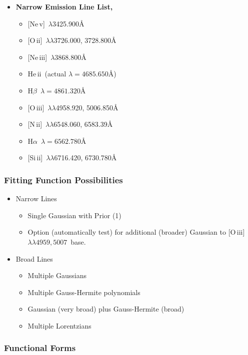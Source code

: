 \documentclass[12pt,letterpaper]{article}
\newcommand{\Halpha}{\ifmmode {\rm H}\alpha \else H$\alpha$\fi}
\newcommand{\Hbeta}{\ifmmode {\rm H}\beta \else H$\beta$\fi}
\newcommand{\heii}{He\,{\sc ii}}
\newcommand{\neiii}{Ne\,{\sc iii}}
\newcommand{\nev}{Ne\,{\sc v}}
\newcommand{\nii}{N\,{\sc ii}}
\newcommand{\oii}{O\,{\sc ii}}
\newcommand{\oiii}{O\,{\sc iii}}
\newcommand{\ob}{[O\,{\sc iii}]\,$\lambda \lambda 4959,5007$}
\newcommand{\Sizw}{Si\,{\sc ii}}
\begin{document}
\begin{itemize}
\item{\bf Narrow Emission Line List, }
  \begin{itemize}
    \itemsep-0.1cm
    \item {[\nev]\, $\lambda$3425.900\AA}
    \item {[\oii]\, $\lambda \lambda$3726.000, 3728.800\AA}
    \item {[\neiii]\, $\lambda$3868.800\AA}
    \item \heii\ (actual $\lambda=4685.650$\AA) 
    \item \Hbeta\ $\lambda=4861.320$\AA
    \item {[\oiii]\, $\lambda \lambda$4958.920, 5006.850\AA}
    \item {[\nii]\, $\lambda \lambda$6548.060, 6583.39\AA}
    \item \Halpha\ $\lambda=6562.780$\AA
    \item {[\Sizw]\, $\lambda \lambda$6716.420, 6730.780\AA}
  \end{itemize}

\end{itemize}

\subsubsection*{Fitting Function Possibilities}

  \begin{itemize}
    \item Narrow Lines
      \begin{itemize}
        \item Single Gaussian with Prior (1)
        \item Option (automatically test) for additional (broader) Gaussian to \ob\ base.
      \end{itemize}
    \item Broad Lines
      \begin{itemize}
        \item Multiple Gaussians
        \item Multiple Gauss-Hermite polynomials
        \item Gaussian (very broad) plus Gauss-Hermite (broad)
        \item Multiple Lorentzians
      \end{itemize}
   \end{itemize}

\subsubsection*{Functional Forms}
\end{document}
